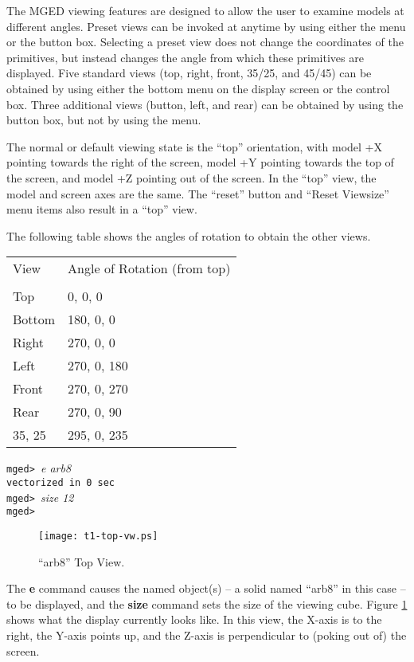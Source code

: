 The MGED viewing features are designed to allow the user to examine
models at different angles.
Preset views can be invoked at
anytime by using either the menu or the button box.
Selecting a preset view does
not change the coordinates of the primitives,
but instead changes the angle from which these primitives are
displayed.  Five standard views (top, right, front, 35/25, and 45/45) can
be obtained by using either the bottom menu on the display screen or the
control box.
Three additional views (button, left, and rear) can be obtained
by using the button box, but not by using the menu.

The normal or default viewing state is the ``top'' orientation,
with model +X pointing towards the right of the screen,
model +Y pointing towards the top of the screen,
and model +Z pointing out of the screen.
In the ``top'' view, the model and screen axes are the same.
The ``reset'' button and ``Reset Viewsize'' menu items also
result in a ``top'' view.

The following table shows the angles of rotation to obtain the other views.
\begin{tabular}{l l}
View    &            Angle of Rotation (from top) \\
 \\
Top      &                     0, 0, 0 \\
Bottom   &                   180, 0, 0 \\
Right    &                   270, 0, 0 \\
Left     &                  270, 0, 180 \\
Front    &                  270, 0, 270 \\
Rear     &                  270, 0, 90 \\
35, 25   &                  295, 0, 235 \\
\end{tabular}

\noindent
{\tt mged>\ }{\em e arb8}\\
{\tt vectorized in 0 sec}\\
{\tt mged>\ }{\em size 12}\\
{\tt mged> }\\

\begin{figure}
\centering \texttt{[image: t1-top-vw.ps]}
\caption{``arb8'' Top View.}
\label{t1-top-vw}
\end{figure}

The {\bf e} command causes the named object(s) -- a solid named ``arb8''
in this case
-- to be displayed, and the {\bf size} command sets the size of the
viewing cube. Figure \ref{t1-top-vw} shows what the display currently
looks like.  In this view, the X-axis is to the right, the Y-axis points
up, and the Z-axis is perpendicular to (poking out of) the screen.

